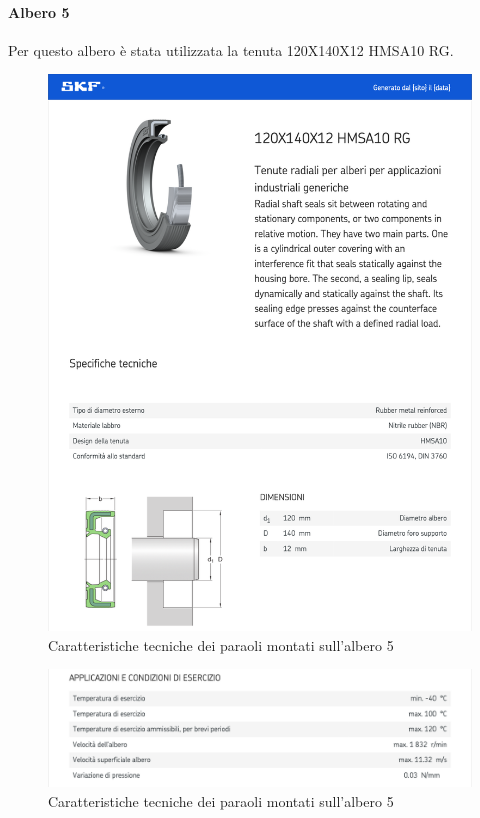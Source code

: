 \paragraph{Albero 5}
Per questo albero è stata utilizzata la tenuta 120X140X12 HMSA10 RG.\\
\begin{figure}[h]
    \centering
    \includegraphics[scale=0.5]{Immagini/Paraolio1Albero5}
    \caption{Caratteristiche tecniche dei paraoli montati sull'albero 5}
    \label{fig:Paraolio1Albero5}
\end{figure}
\newpage
\begin{figure}[h]
    \centering
    \includegraphics[scale=0.5]{Immagini/Paraolio2Albero5}
    \caption{Caratteristiche tecniche dei paraoli montati sull'albero 5}
    \label{fig:Paraolio2Albero5}
\end{figure}